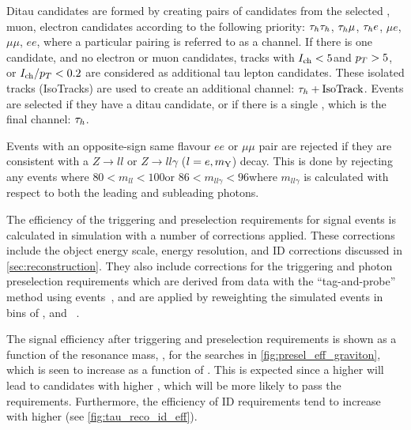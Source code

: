 Ditau candidates are formed by creating pairs of candidates from the selected \tauh, muon, electron candidates according to the following priority: $\tau_h\tau_h$, $\tau_h\mu$, $\tau_h e$, $\mu e$, $\mu\mu$, $ee$, where a particular pairing is referred to as a channel. If there is one \tauh candidate, and no electron or muon candidates, tracks with $I_{\text{ch}} < 5$\GeV and $p_T > 5$\GeV, or $I_{\text{ch}} / p_T < 0.2$ are considered as additional tau lepton candidates. These isolated tracks (IsoTracks) are used to create an additional channel: $\tau_h + \text{IsoTrack}$. Events are selected if they have a ditau candidate, or if there is a single \tauh, which is the final channel: $\tau_h$.

Events with an opposite-sign same flavour $ee$ or $\mu\mu$ pair are rejected if they are consistent with a $Z \to ll$ or $Z \to ll\gamma$ ($l = e, m_{\mathrm{Y}}$) decay. This is done by rejecting any events where $80 < m_{ll} < 100$\GeV or $86 < m_{ll\gamma} < 96$\GeV where $m_{ll\gamma}$ is calculated with respect to both the leading and subleading photons.

The efficiency of the triggering and preselection requirements for signal events is calculated in simulation with a number of corrections applied. These corrections include the object energy scale, energy resolution, and ID corrections discussed in \cref{sec:reconstruction}. They also include corrections for the triggering and photon preselection requirements which are derived from data with the ``tag-and-probe'' method using \Zee events~\cite{CMS:2011aa}, and are applied by reweighting the simulated events in bins of \pt, \RNINE and \eta~\cite{CMS:2018piu,CMS:2020xrn,CMS:2021kom}.

The signal efficiency after triggering and preselection requirements is shown as a function of the resonance mass, \mX, for the \XHH searches in \cref{fig:presel_eff_graviton}, which is seen to increase as a function of \mX. This is expected since a higher \mX will lead to candidates with higher \pt, which will be more likely to pass the \pt requirements. Furthermore, the efficiency of ID requirements tend to increase with higher \pt (see \cref{fig:tau_reco_id_eff}). 

